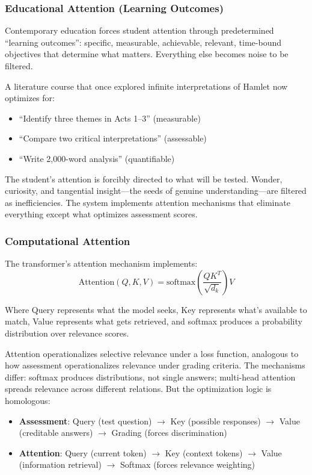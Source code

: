 \subsubsection{Educational Attention (Learning Outcomes)}

Contemporary education forces student attention through predetermined ``learning outcomes'': specific, measurable, achievable, relevant, time-bound objectives that determine what matters. Everything else becomes noise to be filtered.

A literature course that once explored infinite interpretations of Hamlet now optimizes for:
\begin{itemize}
\item ``Identify three themes in Acts 1--3'' (measurable)
\item ``Compare two critical interpretations'' (assessable)
\item ``Write 2,000-word analysis'' (quantifiable)
\end{itemize}

The student's attention is forcibly directed to what will be tested. Wonder, curiosity, and tangential insight---the seeds of genuine understanding---are filtered as inefficiencies. The system implements attention mechanisms that eliminate everything except what optimizes assessment scores.

\subsubsection{Computational Attention}

The transformer's attention mechanism implements:
\begin{equation}
\text{Attention}(Q,K,V) = \text{softmax}\left(\frac{QK^T}{\sqrt{d_k}}\right)V
\end{equation}

Where Query represents what the model seeks, Key represents what's available to match, Value represents what gets retrieved, and softmax produces a probability distribution over relevance scores.

Attention operationalizes selective relevance under a loss function, analogous to how assessment operationalizes relevance under grading criteria. The mechanisms differ: softmax produces distributions, not single answers; multi-head attention spreads relevance across different relations. But the optimization logic is homologous:

\begin{itemize}
\item \textbf{Assessment}: Query (test question) $\rightarrow$ Key (possible responses) $\rightarrow$ Value (creditable answers) $\rightarrow$ Grading (forces discrimination)
\item \textbf{Attention}: Query (current token) $\rightarrow$ Key (context tokens) $\rightarrow$ Value (information retrieval) $\rightarrow$ Softmax (forces relevance weighting)
\end{itemize}

